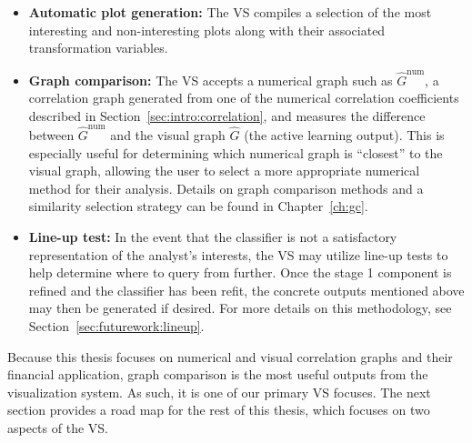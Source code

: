 \tablespacing
\begin{itemize}
	\item \textbf{Automatic plot generation:} The VS compiles a selection of 
	the most interesting and non-interesting plots along with their 
	associated transformation variables.
	
	\item \textbf{Graph comparison:} The VS accepts a numerical graph such as 
	$\hat{G}^{\text{num}}$, a correlation graph generated from one of the 
	numerical correlation coefficients described in 
	Section~\ref{sec:intro:correlation}, and measures the difference 
	between $\hat{G}^{\text{num}}$ and the visual graph $\hat{G}$ (the active 
	learning output). This is especially useful 
	for determining which numerical graph is ``closest'' to the visual graph, 
	allowing the user to select a more appropriate numerical method for their 
	analysis. Details on graph comparison methods and a similarity 
	selection strategy can be found in Chapter~\ref{ch:gc}.
	
	\item \textbf{Line-up test:} In the event that the classifier is not a 
	satisfactory representation of the analyst's interests, the VS may utilize 
	line-up tests to help determine where to query from further. Once the stage 
	1 component is refined and the classifier has been refit, the concrete 
	outputs mentioned above may then be generated if desired. For more 
	details on this methodology, see Section~\ref{sec:futurework:lineup}.
\end{itemize}
\bodyspacing

Because this thesis focuses on numerical and visual correlation graphs and 
their financial application, graph comparison is 
the most useful outputs from the visualization system. As such, it is one of 
our 
primary VS focuses. The next section provides a road map for the rest of this 
thesis, which focuses on two aspects of the VS. 